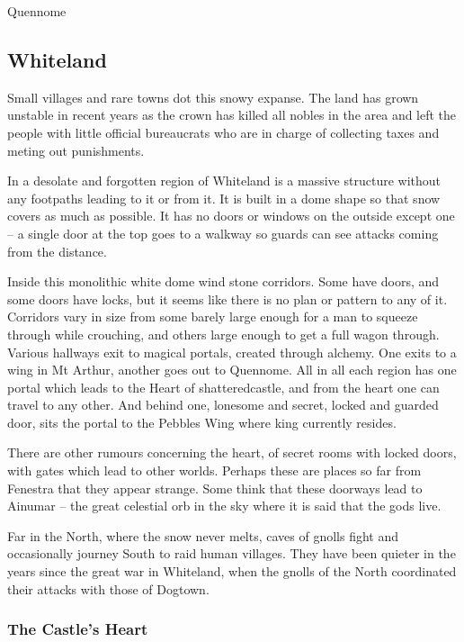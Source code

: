 \begin{multicols}{2}
\begin{encounters}{Quennome}
\end{encounters}

\subsection{Whiteland}

Small villages and rare towns dot this snowy expanse.  The land has grown unstable in recent years as the crown has killed all nobles in the area and left the people with little official bureaucrats who are in charge of collecting taxes and meting out punishments.

In a desolate and forgotten region of Whiteland is a massive structure without any footpaths leading to it or from it.
It is built in a dome shape so that snow covers as much as possible.
It has no doors or windows on the outside except one -- a single door at the top goes to a walkway so guards can see attacks coming from the distance.

Inside this monolithic white dome wind stone corridors.
Some have doors, and some doors have locks, but it seems like there is no plan or pattern to any of it.
Corridors vary in size from some barely large enough for a man to squeeze through while crouching, and others large enough to get a full wagon through.
Various hallways exit to magical portals, created through alchemy.
One exits to a wing in Mt Arthur, another goes out to Quennome.
All in all each region has one portal which leads to the Heart of \gls{shatteredcastle}, and from the heart one can travel to any other.
And behind one, lonesome and secret, locked and guarded door, sits the portal to the Pebbles Wing where \gls{king} currently resides.

There are other rumours concerning the heart, of secret rooms with locked doors, with gates which lead to other worlds.  Perhaps these are places so far from Fenestra that they appear strange.  Some think that these doorways lead to Ainumar -- the great celestial orb in the sky where it is said that the gods live.

Far in the North, where the snow never melts, caves of gnolls fight and occasionally journey South to raid human villages.  They have been quieter in the years since the great war in Whiteland, when the gnolls of the North coordinated their attacks with those of Dogtown.

\subsubsection{The Castle's Heart}\label{whiteland_heart}


\end{multicols}
